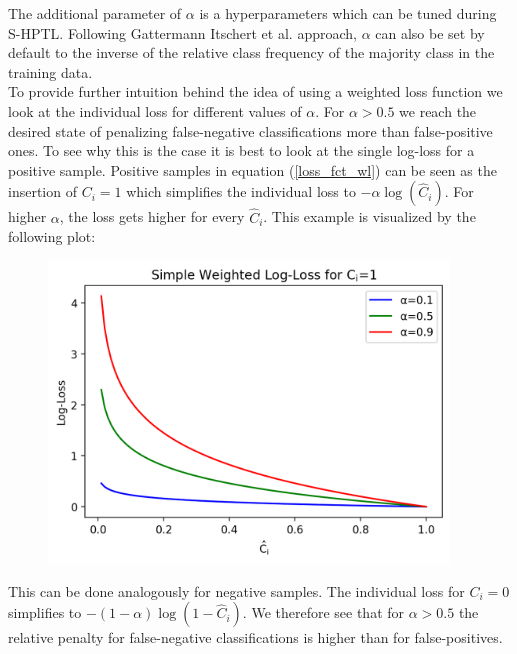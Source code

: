 \documentclass[12pt,titlepage]{article}
\begin{document}
\noindent
The additional parameter of $\alpha$ is a hyperparameters which can be tuned during S-HPTL. Following Gattermann Itschert et al. \cite{multiplets} approach, $\alpha$ can also be set by default to the inverse of the relative class frequency of the majority class in the training data. \\
To provide further intuition behind the idea of using a weighted loss function we look at the individual loss for different values of $\alpha$. For $\alpha>0.5$ we reach the desired state of penalizing false-negative classifications more than false-positive ones. To see why this is the case it is best to look at the single log-loss for a positive sample. Positive samples in equation (\ref{loss_fct_wl}) can be seen as the insertion of $C_{i}=1$ which simplifies the individual loss to $-\alpha \log(\hat{C}_{i})$. For higher $\alpha$, the loss gets higher for every $\hat{C}_{i}$. This example is visualized by the following plot: \\
\begin{figure}[H]
    \centerline{\includegraphics[height=8cm]{weighted_loss.png}}
\end{figure}
\noindent
This can be done analogously for negative samples. The individual loss for $C_{i}=0$ simplifies to $-(1-\alpha)\log(1-\hat{C}_{i})$. We therefore see that for $\alpha>0.5$ the relative penalty for false-negative classifications is higher than for false-positives. \\
\end{document}
